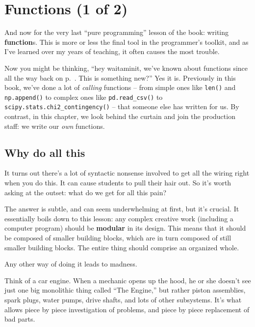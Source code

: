 
\chapter{Functions (1 of 2)}
\label{ch:functions}


And now for the very last ``pure programming'' lesson of the book: writing
\textbf{function}s. This is more or less the final tool in the programmer's
toolkit, and as I've learned over my years of teaching, it often causes the
most trouble.

Now you might be thinking, ``hey waitaminit, we've known about functions since
all the way back on p.~\pageref{function}. This is something new?'' Yes it is.
Previously in this book, we've done a lot of \textit{calling} functions -- from
simple ones like \texttt{len()} and \texttt{np.append()} to complex ones like
\texttt{pd.read\_csv()} to \texttt{scipy.stats.chi2\_contingency()} -- that
someone else has written for us. By contrast, in this chapter, we look behind
the curtain and join the production staff: we write our \textit{own} functions.

\section{Why do all this}

It turns out there's a lot of syntactic nonsense involved to get all the wiring
right when you do this. It can cause students to pull their hair out. So it's
worth asking at the outset: what do we get for all this pain?


The answer is subtle, and can seem underwhelming at first, but it's crucial. It
essentially boils down to this lesson: any complex creative work (including a
computer program) should be \textbf{modular} in its design. This means that it
should be composed of smaller building blocks, which are in turn composed of
still smaller building blocks. The entire thing should comprise an organized
whole.

Any other way of doing it leads to madness.


Think of a car engine. When a mechanic opens up the hood, he or she doesn't see
just one big monolithic thing called ``The Engine,'' but rather piston
assemblies, spark plugs, water pumps, drive shafts, and lots of other
subsystems. It's what allows piece by piece investigation of problems, and
piece by piece replacement of bad parts.

